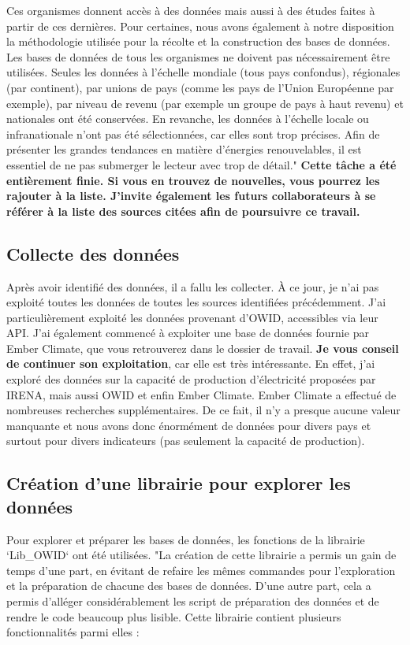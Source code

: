 \documentclass[12pt]{article}
\begin{document}
Ces organismes donnent accès à des données mais aussi à des études faites à partir de ces dernières. 
Pour certaines, nous avons également à notre disposition la méthodologie utilisée pour la récolte et 
la construction des bases de données. Les bases de données de tous les organismes ne doivent
pas nécessairement être utilisées. Seules les données à l'échelle mondiale (tous pays confondus), 
régionales (par continent), par unions de pays (comme les pays de l'Union Européenne par exemple), 
par niveau de revenu (par exemple un groupe de pays à haut revenu) et nationales ont été conservées. 
En revanche, les données à l'échelle locale ou infranationale n'ont pas été sélectionnées, 
car elles sont trop précises. Afin de présenter les grandes tendances en matière d'énergies 
renouvelables, il est essentiel de ne pas submerger le lecteur avec trop de détail."\cite{memoir}
\textbf{Cette tâche a été entièrement finie. Si vous en trouvez de nouvelles, vous pourrez les rajouter 
à la liste. J'invite également les futurs collaborateurs à se référer à la liste des sources citées 
afin de poursuivre ce travail.}


\subsection{Collecte des données}

Après avoir identifié des données, il a fallu les collecter. À ce jour, 
je n'ai pas exploité toutes les données de toutes les sources identifiées 
précédemment. J'ai particulièrement exploité les données provenant d'OWID, 
accessibles via leur API\cite{API_OWID}. J'ai également commencé à exploiter une base de 
données fournie par Ember Climate, que vous retrouverez dans le dossier de 
travail. \textbf{Je vous conseil de continuer son exploitation}, car elle est très intéressante. 
En effet, j'ai  exploré des données sur la capacité de 
production d'électricité proposées par IRENA, mais aussi OWID et enfin Ember Climate. 
Ember Climate a effectué de nombreuses recherches supplémentaires. De ce fait, il n'y a 
presque aucune valeur manquante et nous avons donc énormément de données pour divers 
pays et surtout pour divers indicateurs (pas seulement la capacité de production). 


\subsection{Création d'une librairie pour explorer les données}

Pour explorer et préparer les bases de données, 
les fonctions de la librairie `Lib\_OWID` ont été utilisées. 
"La création de cette librairie a permis un gain de temps d'une part, en évitant de refaire les 
mêmes commandes pour l'exploration et la préparation de chacune des bases de données. D'une autre 
part, cela a permis d'alléger considérablement les script de préparation des données et de rendre le 
code beaucoup plus lisible. Cette librairie contient plusieurs fonctionnalités parmi elles :
\end{document}
